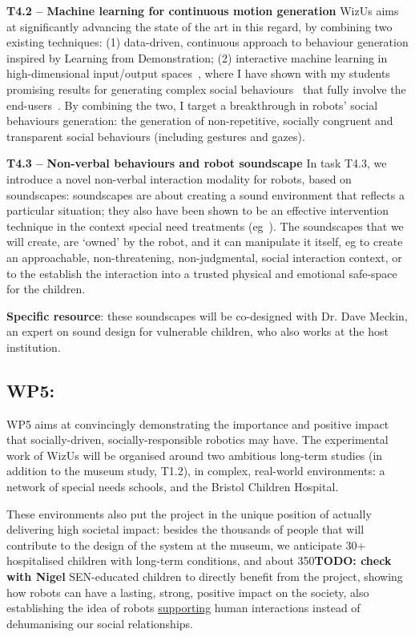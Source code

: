 \documentclass[11pt,a4paper]{report}
\newcommand{\project}{WizUs\xspace}
\newcommand{\TODO}[1]{{\color{red}\textbf{TODO: #1}}}
\begin{document}
\textbf{T4.2 -- Machine learning for continuous motion generation} \project aims
at significantly advancing the state of the art in this regard, by combining two
existing techniques: (1) data-driven, continuous approach to behaviour
generation inspired by Learning from Demonstration; (2) interactive machine
learning in high-dimensional input/output spaces~\cite{senft2020woz}, where I
have shown with my students promising results for generating complex social
behaviours~\cite{senft2019teaching, winkle2020coach} that fully involve the
end-users~\cite{winkle2020methodology}.  By combining the two, I target
a breakthrough in robots' social behaviours generation: the generation of
non-repetitive, socially congruent and transparent social behaviours (including
gestures and gazes).

\textbf{T4.3 -- Non-verbal behaviours and robot soundscape} In task T4.3, we
introduce a novel non-verbal interaction modality for robots, based on
soundscapes: soundscapes are about creating a sound environment that reflects a
particular situation; they also have been shown to be an effective intervention
technique in the context special need treatments
(eg~\cite{greher2010soundscape}). The soundscapes that we will create, are
`owned' by the robot, and it can manipulate it itself, eg to create an
approachable, non-threatening, non-judgmental, social interaction context, or to
the establish the interaction into a trusted physical and emotional safe-space
for the children.

\textbf{Specific resource}: these soundscapes will be co-designed with Dr.
Dave Meckin, an expert on sound design for vulnerable children, who also works
at the host institution.

\subsection{WP5: \textbf{\wpFive}}

\noindent{}

WP5 aims at convincingly demonstrating the importance and positive impact that
socially-driven, socially-responsible robotics may have. The experimental work
of \project will be organised around two ambitious long-term studies (in
addition to the museum study, T1.2), in complex, real-world environments: a
network of special needs schools, and the Bristol Children Hospital.

These environments also put the project in the unique position of actually
delivering high societal impact: besides the thousands of people that will
contribute to the design of the system at the museum, we anticipate 30+
hospitalised children with long-term conditions, and about 350\TODO{check with
Nigel} SEN-educated children to directly benefit from the project, showing how
robots can have a lasting, strong, positive impact on the society, also
establishing the idea of robots \ul{supporting} human interactions instead of
dehumanising our social relationships.
\end{document}
